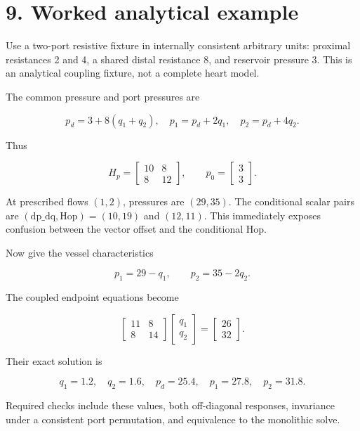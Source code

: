 \documentclass[11pt,a4paper]{article}
\begin{document}
\clearpage
{}
\section{9. Worked analytical example}
Use a two-port resistive fixture in internally consistent arbitrary units: proximal resistances 2 and 4, a shared distal resistance 8, and reservoir pressure 3. This is an analytical coupling fixture, not a complete heart model.

The common pressure and port pressures are


\nopagebreak[3]
\[
p_d=3+8(q_1+q_2),\quad p_1=p_d+2q_1,\quad p_2=p_d+4q_2.
\]


Thus


\nopagebreak[3]
\[
H_p=\begin{bmatrix}10&8\\8&12\end{bmatrix},\qquad
p_0=\begin{bmatrix}3\\3\end{bmatrix}.
\]


At prescribed flows \((1, 2)\), pressures are \((29, 35)\). The conditional scalar pairs are \((\mathrm{dp\_dq},\mathrm{Hop})=(10,19)\) and \((12, 11)\). This immediately exposes confusion between the vector offset and the conditional Hop.

Now give the vessel characteristics


\nopagebreak[3]
\[
p_1=29-q_1,\qquad p_2=35-2q_2.
\]


The coupled endpoint equations become


\nopagebreak[3]
\[
\begin{bmatrix}11&8\\8&14\end{bmatrix}
\begin{bmatrix}q_1\\q_2\end{bmatrix}
=\begin{bmatrix}26\\32\end{bmatrix}.
\]


Their exact solution is


\nopagebreak[3]
\[
q_1=1.2,\quad q_2=1.6,\quad p_d=25.4,
\quad p_1=27.8,\quad p_2=31.8.
\]


Required checks include these values, both off-diagonal responses, invariance under a consistent port permutation, and equivalence to the monolithic solve.
\end{document}
